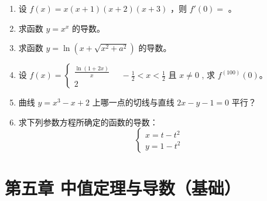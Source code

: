 \documentclass[12pt, a4paper]{article}
\begin{document}
\begin{enumerate}
    \item 设 $ f(x) = x(x + 1)(x + 2)(x + 3) $ ，则 $ f'(0) = $ \underline{\hspace{2cm}}。

    \item 求函数 $ y = x^{x} $ 的导数。

    \item 求函数 $ y = \ln(x + \sqrt{x^{2} + a^{2}}) $ 的导数。

    \item 设 $ f(x)=\begin{cases}\frac{\ln(1+2x)}{x}\\2\end{cases} \quad -\frac{1}{2}<x<\frac{1}{2} $ 且 $ x\neq0 $ , 求 $ f^{(100)}(0) $。

    \item 曲线 $ y = x^{3} - x + 2 $ 上哪一点的切线与直线 $ 2x - y - 1 = 0 $ 平行？

    \item 求下列参数方程所确定的函数的导数：
    $$ \begin{cases}x=t-t^{2}\\ y=1-t^{2}\end{cases} $$
\end{enumerate}

\section*{第五章 中值定理与导数（基础）}
\end{document}
